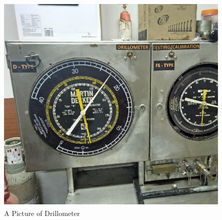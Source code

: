 \vspace{2em}

\begin{figure}[H]
\includegraphics[scale=0.2]{images/drillometer}
\centering 
\caption{A Picture of Drillometer}
\end{figure}

\vspace{2em}


